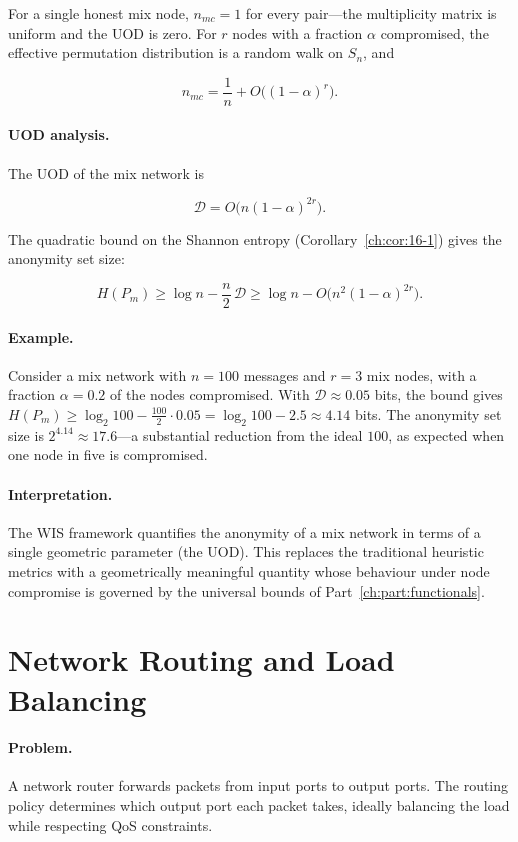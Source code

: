 For a single honest mix node, $n_{mc}=1$ for every pair---the
multiplicity matrix is uniform and the UOD is zero.  For $r$ nodes
with a fraction $\alpha$ compromised, the effective permutation
distribution is a random walk on $S_n$, and

\[
n_{mc} = \frac{1}{n} + O\bigl((1-\alpha)^r\bigr).
\]

\paragraph{UOD analysis.}
The UOD of the mix network is

\[
\mathcal D = O\bigl(n(1-\alpha)^{2r}\bigr).
\]

The quadratic bound on the Shannon entropy (Corollary~\ref{ch:cor:16-1}) gives
the anonymity set size:

\[
H(P_m) \ge \log n - \frac{n}{2}\,\mathcal D
\ge \log n - O\bigl(n^2(1-\alpha)^{2r}\bigr).
\]

\paragraph{Example.}
Consider a mix network with $n=100$ messages and $r=3$ mix nodes,
with a fraction $\alpha=0.2$ of the nodes compromised.  With
$\mathcal D\approx0.05$ bits, the bound gives
$H(P_m) \ge \log_2 100 - \frac{100}{2}\cdot0.05 = \log_2 100 - 2.5
\approx 4.14$ bits.
The anonymity set size is $2^{4.14}\approx17.6$---a substantial
reduction from the ideal $100$, as expected when one node in five
is compromised.

\paragraph{Interpretation.}
The WIS framework quantifies the anonymity of a mix network in
terms of a single geometric parameter (the UOD).  This replaces
the traditional heuristic metrics with a geometrically meaningful
quantity whose behaviour under node compromise is governed by the
universal bounds of Part~\ref{ch:part:functionals}.

\section{Network Routing and Load Balancing}\label{ch:sec:network-routing-and-load-balancing}
\label{sec:app-routing}

\paragraph{Problem.}
A network router forwards packets from input ports to output
ports.  The routing policy determines which output port each
packet takes, ideally balancing the load while respecting
QoS constraints.

